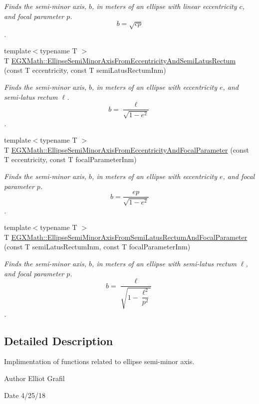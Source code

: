 \begin{DoxyCompactItemize}
\begin{DoxyCompactList}\small\item\em Finds the semi-\/minor axis, $b$, in meters of an ellipse with linear eccentricity $c$, and focal parameter $p$. \[ b=\sqrt{c p} \]. \end{DoxyCompactList}\item 
{\footnotesize template$<$typename T $>$ }\\T \mbox{\hyperlink{group___e_g_x_math-_geometry-2_d-_ellipse-_semi_minor_axis_ga1194f5481c66c492147a27b9e167df4f}{E\+G\+X\+Math\+::\+Ellipse\+Semi\+Minor\+Axis\+From\+Eccentricity\+And\+Semi\+Latus\+Rectum}} (const T eccentricity, const T semi\+Latus\+Rectum\+Inm)
\begin{DoxyCompactList}\small\item\em Finds the semi-\/minor axis, $b$, in meters of an ellipse with eccentricity $e$, and semi-\/latus rectum $\ell$. \[ b=\dfrac{\ell}{\sqrt{1 - e^2}} \]. \end{DoxyCompactList}\item 
{\footnotesize template$<$typename T $>$ }\\T \mbox{\hyperlink{group___e_g_x_math-_geometry-2_d-_ellipse-_semi_minor_axis_ga7bfc286b245acfcfd6c6bce85d25cdbb}{E\+G\+X\+Math\+::\+Ellipse\+Semi\+Minor\+Axis\+From\+Eccentricity\+And\+Focal\+Parameter}} (const T eccentricity, const T focal\+Parameter\+Inm)
\begin{DoxyCompactList}\small\item\em Finds the semi-\/minor axis, $b$, in meters of an ellipse with eccentricity $e$, and focal parameter $p$. \[ b=\dfrac{ep}{\sqrt{1 - e^2}} \]. \end{DoxyCompactList}\item 
{\footnotesize template$<$typename T $>$ }\\T \mbox{\hyperlink{group___e_g_x_math-_geometry-2_d-_ellipse-_semi_minor_axis_gafe27ed64ba521ec3cf8557520cbc6a14}{E\+G\+X\+Math\+::\+Ellipse\+Semi\+Minor\+Axis\+From\+Semi\+Latus\+Rectum\+And\+Focal\+Parameter}} (const T semi\+Latus\+Rectum\+Inm, const T focal\+Parameter\+Inm)
\begin{DoxyCompactList}\small\item\em Finds the semi-\/minor axis, $b$, in meters of an ellipse with semi-\/latus rectum $\ell$, and focal parameter $p$. \[ b=\dfrac{\ell}{\sqrt{1-\dfrac{\ell^2}{p^2}}} \]. \end{DoxyCompactList}\end{DoxyCompactItemize}


\subsection{Detailed Description}
Implimentation of functions related to ellipse semi-\/minor axis. 

\begin{DoxyAuthor}{Author}
Elliot Grafil 
\end{DoxyAuthor}
\begin{DoxyDate}{Date}
4/25/18 
\end{DoxyDate}
